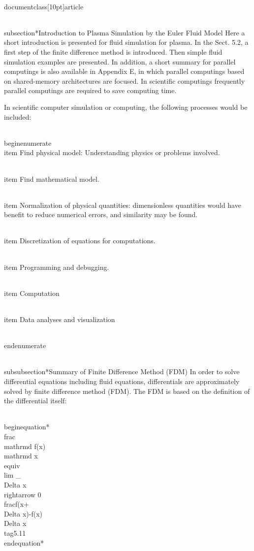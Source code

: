 \\documentclass[10pt]{article}
\begin{document}
\\subsection*{Introduction to Plasma Simulation by the Euler Fluid Model}
Here a short introduction is presented for fluid simulation for plasma. In the Sect. 5.2, a first step of the finite difference method is introduced. Then simple fluid simulation examples are presented. In addition, a short summary for parallel computings is also available in Appendix E, in which parallel computings based on shared-memory architectures are focused. In scientific computings frequently parallel computings are required to save computing time.

In scientific computer simulation or computing, the following processes would be included:

\\begin{enumerate}
  \\item Find physical model: Understanding physics or problems involved.

  \\item Find mathematical model.

  \\item Normalization of physical quantities: dimensionless quantities would have benefit to reduce numerical errors, and similarity may be found.

  \\item Discretization of equations for computations.

  \\item Programming and debugging.

  \\item Computation

  \\item Data analyses and visualization

\\end{enumerate}

\\subsubsection*{Summary of Finite Difference Method (FDM)}
In order to solve differential equations including fluid equations, differentials are approximately solved by finite difference method (FDM). The FDM is based on the definition of the differential itself:


\\begin{equation*}
\\frac{\\mathrm{d} f(x)}{\\mathrm{d} x} \\equiv \\lim _{\\Delta x \\rightarrow 0} \\frac{f(x+\\Delta x)-f(x)}{\\Delta x} \\tag{5.11}
\\end{equation*}
\end{document}

